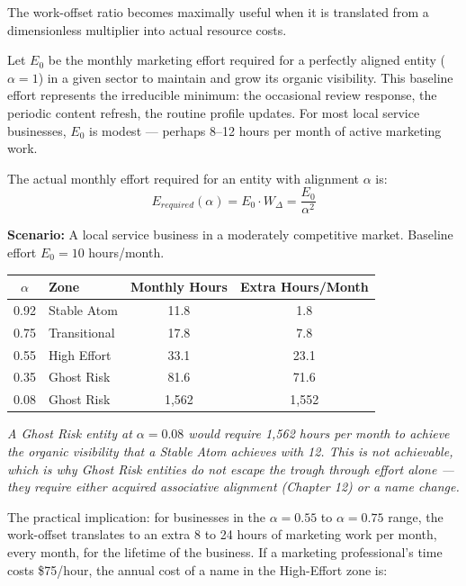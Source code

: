\documentclass[12pt, openany]{book}
\theoremstyle{thmstyle}
\theoremstyle{defstyle}
\begin{document}
The work-offset ratio becomes maximally useful when it is translated from a dimensionless multiplier into actual resource costs.

Let $E_0$ be the monthly marketing effort required for a perfectly aligned entity ($\alpha = 1$) in a given sector to maintain and grow its organic visibility. This baseline effort represents the irreducible minimum: the occasional review response, the periodic content refresh, the routine profile updates. For most local service businesses, $E_0$ is modest --- perhaps 8--12 hours per month of active marketing work.

The actual monthly effort required for an entity with alignment $\alpha$ is:
\begin{equation}
E_{required}(\alpha) = E_0 \cdot W_\Delta = \frac{E_0}{\alpha^2}
\label{eq:effort_required}
\end{equation}

\begin{calcbox}
\textbf{Scenario:} A local service business in a moderately competitive market. Baseline effort $E_0 = 10$ hours/month.

\vspace{6pt}
\begin{center}
\begin{tabular}{clcc}
\toprule
$\alpha$ & \textbf{Zone} & \textbf{Monthly Hours} & \textbf{Extra Hours/Month} \\
\midrule
0.92 & Stable Atom & 11.8 & 1.8 \\
0.75 & Transitional & 17.8 & 7.8 \\
0.55 & High Effort & 33.1 & 23.1 \\
0.35 & Ghost Risk & 81.6 & 71.6 \\
0.08 & Ghost Risk & 1,562 & 1,552 \\
\bottomrule
\end{tabular}
\end{center}

\vspace{6pt}
\textit{A Ghost Risk entity at $\alpha = 0.08$ would require 1,562 hours per month to achieve the organic visibility that a Stable Atom achieves with 12. This is not achievable, which is why Ghost Risk entities do not escape the trough through effort alone --- they require either acquired associative alignment (Chapter 12) or a name change.}
\end{calcbox}

The practical implication: for businesses in the $\alpha = 0.55$ to $\alpha = 0.75$ range, the work-offset translates to an extra 8 to 24 hours of marketing work per month, every month, for the lifetime of the business. If a marketing professional's time costs \$75/hour, the annual cost of a name in the High-Effort zone is:
\end{document}
